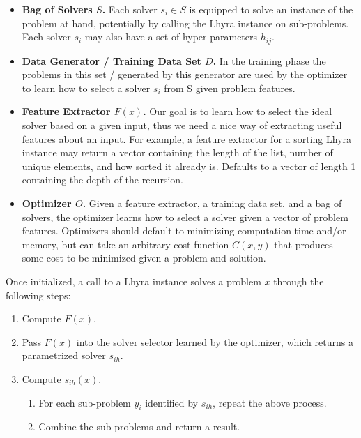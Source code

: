 \documentclass[11pt]{article}
\begin{document}
\begin{itemize}
	\item \textbf{Bag of Solvers $S$.} Each solver $s_i \in S$ is equipped to solve an instance of the problem at hand, potentially by calling the Lhyra instance on sub-problems. Each solver $s_i$ may also have a set of hyper-parameters $h_{ij}$. 

	\item \textbf{Data Generator / Training Data Set $D$.} In the training phase the problems in this set / generated by this generator are used by the optimizer to learn how to select a solver $s_i$ from S given problem features.

	\item \textbf{Feature Extractor $F(x)$.} Our goal is to learn how to select the ideal solver based on a given input, thus we need a nice way of extracting useful features about an input. For example, a feature extractor for a sorting Lhyra instance may return a vector containing the length of the list, number of unique elements, and how sorted it already is. Defaults to a vector of length 1 containing the depth of the recursion.

	\item \textbf{Optimizer $O$.} Given a feature extractor, a training data set, and a bag of solvers, the optimizer learns how to select a solver given a vector of problem features.  Optimizers should default to minimizing computation time and/or memory, but can take an arbitrary cost function $C(x,y)$ that produces some cost to be minimized given a problem and solution. 
\end{itemize}

Once initialized, a call to a Lhyra instance solves a problem $x$ through the following steps:

\begin{enumerate}
	\item Compute $F(x)$.
	\item Pass $F(x)$ into the solver selector learned by the optimizer, which returns a parametrized solver $s_{ih}$.
	\item Compute $s_{ih}(x)$.
	\begin{enumerate}
		\item For each sub-problem $y_i$ identified by $s_{ih}$, repeat the above process.
		\item Combine the sub-problems and return a result.
	\end{enumerate}
\end{enumerate}
\end{document}
